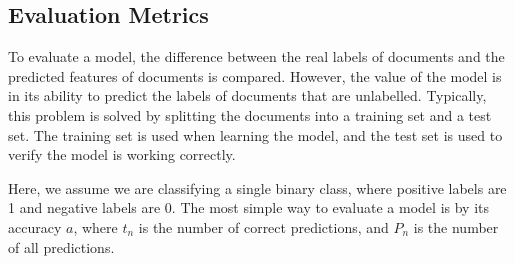 




\subsection{Evaluation Metrics}\label{bg:metrics}

To evaluate a model, the difference between the real labels of documents and the predicted features of documents is compared. However, the value of the model is in its ability to predict the labels of documents that are unlabelled. Typically, this problem is solved by splitting the documents into a training set and a test set. The training set is used when learning the model, and the test set is used to verify the model is working correctly. 

Here, we assume we are classifying a single binary class, where positive labels are 1 and negative labels are 0. The most simple way to evaluate a model is by its accuracy $a$, where ${t_n}$ is the number of correct predictions, and $P_n$ is the number of all predictions.


